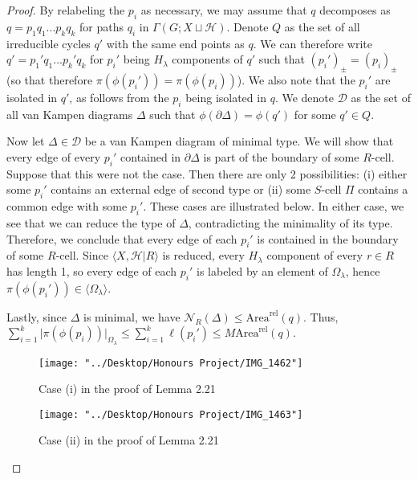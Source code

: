 \documentclass[12pt]{article}
\newcommand{\vs}{\vskip10pt}
\begin{document}
	\begin{proof}
		
		By relabeling the $p_i$ as necessary, we may assume that $q$ decomposes as $q = p_1 q_1 ... p_k q_k$ for paths $q_i$ in $\Gamma(G; X \sqcup \mathcal{H})$. Denote $Q$ as the set of all irreducible cycles $q'$ with the same end points as $q$. We can therefore write $q' = p_1'q_1...p_k' q_k$ for $p_i'$ being $H_{\lambda}$ components of $q'$ such that $(p_i')_{\pm} = (p_i)_{\pm}$ (so that therefore $\pi(\phi(p_i')) = \pi(\phi(p_i))$). We also note that the $p_i'$ are isolated in $q'$, as follows from the $p_i$ being isolated in $q$. We denote $\mathcal{D}$ as the set of all van Kampen diagrams $\Delta$ such that $\phi(\partial \Delta) = \phi(q')$ for some $q' \in Q$. 
		
		\vs 
		
		Now let $\Delta \in \mathcal{D}$ be a van Kampen diagram of minimal type. We will show that every edge of every $p_i'$ contained in $\partial \Delta$ is part of the boundary of some $R$-cell. Suppose that this were not the case. Then there are only 2 possibilities: (i) either some $p_i'$ contains an external edge of second type or (ii) some $S$-cell $\Pi$ contains a common edge with some $p_i'$. These cases are illustrated below. In either case, we see that we can reduce the type of $\Delta$, contradicting the minimality of its type. Therefore, we conclude that every edge of each $p_i'$ is contained in the boundary of some $R$-cell. Since $\langle X, \mathcal{H} \vert R \rangle$ is reduced, every $H_{\lambda}$ component of every $r \in R$ has length 1, so every edge of each $p_i'$ is labeled by an element of $\Omega_{\lambda}$, hence $\pi(\phi(p_i')) \in \langle \Omega_{\lambda} \rangle$. 
		
		\vs 
		
		Lastly, since $\Delta$ is minimal, we have $\mathcal{N}_R(\Delta) \leq \text{Area}^{\text{rel}}(q)$. Thus, $\sum_{i=1}^k \vert \pi(\phi(p_i)) \vert_{\Omega_{\lambda}} \leq \sum_{i=1}^k \ell(p_i') \leq M \text{Area}^{\text{rel}}(q)$.
		
\begin{figure} [H]
	\centering
	\texttt{[image: "../Desktop/Honours Project/IMG\_1462"]}
	\caption{Case (i) in the proof of Lemma 2.21}
	\label{fig:img1462}
\end{figure}

\begin{figure} [H]
	\centering
	\texttt{[image: "../Desktop/Honours Project/IMG\_1463"]}
	\caption{Case (ii) in the proof of Lemma 2.21}
	\label{fig:img1463}
\end{figure}

		
	\end{proof}  
\end{document}
